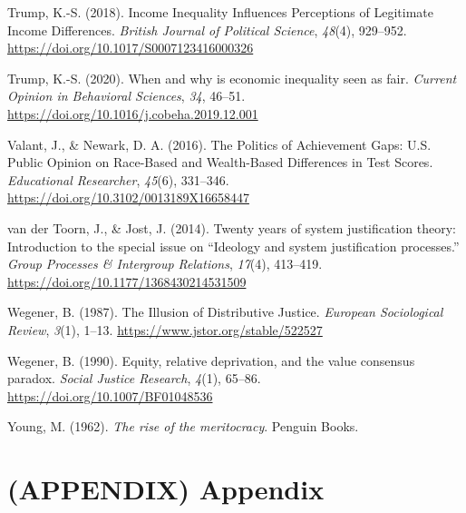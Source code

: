 \documentclass[
  12pt,
  a4paper,
]{article}
\newlength{\cslhangindent}
\newlength{\cslentryspacingunit} %
\newenvironment{CSLReferences}[2] %
 {%
  \setlength{\parindent}{0pt}
  \ifodd #1
  \let\oldpar\par
  \def\par{\hangindent=\cslhangindent\oldpar}
  \fi
  \setlength{\parskip}{#2\cslentryspacingunit}
 }%
 {}
\begin{document}
\begin{CSLReferences}{1}{0}
\leavevmode{}%
Trump, K.-S. (2018). Income {Inequality Influences Perceptions} of
{Legitimate Income Differences}. \emph{British Journal of Political
Science}, \emph{48}(4), 929--952.
\url{https://doi.org/10.1017/S0007123416000326}

\leavevmode{}%
Trump, K.-S. (2020). When and why is economic inequality seen as fair.
\emph{Current Opinion in Behavioral Sciences}, \emph{34}, 46--51.
\url{https://doi.org/10.1016/j.cobeha.2019.12.001}

\leavevmode{}%
Valant, J., \& Newark, D. A. (2016). The {Politics} of {Achievement
Gaps}: {U}.{S}. {Public Opinion} on {Race-Based} and {Wealth-Based
Differences} in {Test Scores}. \emph{Educational Researcher},
\emph{45}(6), 331--346. \url{https://doi.org/10.3102/0013189X16658447}

\leavevmode{}%
van der Toorn, J., \& Jost, J. (2014). Twenty years of system
justification theory: {Introduction} to the special issue on
{``{Ideology} and system justification processes.''} \emph{Group
Processes \& Intergroup Relations}, \emph{17}(4), 413--419.
\url{https://doi.org/10.1177/1368430214531509}

\leavevmode{}%
Wegener, B. (1987). The {Illusion} of {Distributive Justice}.
\emph{European Sociological Review}, \emph{3}(1), 1--13.
\url{https://www.jstor.org/stable/522527}

\leavevmode{}%
Wegener, B. (1990). Equity, relative deprivation, and the value
consensus paradox. \emph{Social Justice Research}, \emph{4}(1), 65--86.
\url{https://doi.org/10.1007/BF01048536}

\leavevmode{}%
Young, M. (1962). \emph{The rise of the meritocracy}. Penguin Books.

\end{CSLReferences}

\newpage

\hypertarget{appendix-appendix}{%
\section*{(APPENDIX) Appendix}\label{appendix-appendix}}
\end{document}
